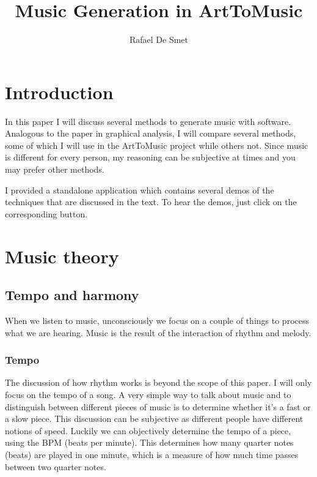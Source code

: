 \documentclass[12pt]{article}
\begin{document}
\title{Music Generation in ArtToMusic}
\author{Rafael De Smet}

\maketitle
\tableofcontents
\newpage

\section{Introduction}

In this paper I will discuss several methods to generate music with software. Analogous to the paper in graphical analysis, I will compare several methods, some of which I will use in the ArtToMusic project while others not. Since music is different for every person, my reasoning can be subjective at times and you may prefer other methods. 
\newline

I provided a standalone application which contains several demos of the techniques that are discussed in the text. To hear the demos, just click on the corresponding button.

\section{Music theory}

\subsection{Tempo and harmony}

When we listen to music, unconsciously we focus on a couple of things to process what we are hearing. Music is the result of the interaction of rhythm and melody.

\subsubsection{Tempo}

The discussion of how rhythm works is beyond the scope of this paper. I will only focus on the tempo of a song. A very simple way to talk about music and to distinguish between different pieces of music is to determine whether it's a fast or a slow piece. This discussion can be subjective as different people have different notions of speed. Luckily we can objectively determine the tempo of a piece, using the BPM (beats per minute).
This determines how many quarter notes (beats) are played in one minute, which is a measure of how much time passes between two quarter notes.
\newline
\end{document}
